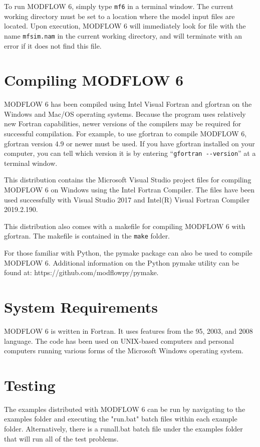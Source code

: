 \documentclass[11pt,twoside,twocolumn]{usgsreport}
\begin{document}
To run MODFLOW 6, simply type \texttt{mf6} in a terminal window.  The current working directory must be set to a location where the model input files are located.  Upon execution, MODFLOW 6 will immediately look for file with the name \texttt{mfsim.nam} in the current working directory, and will terminate with an error if it does not find this file.

\section{Compiling MODFLOW 6}
MODFLOW 6 has been compiled using Intel Visual Fortran and gfortran on the Windows and Mac/OS operating systems.  Because the program uses relatively new Fortran capabilities, newer versions of the compilers may be required for successful compilation.  For example, to use gfortran to compile MODFLOW 6, gfortran version 4.9 or newer must be used.  If you have gfortran installed on your computer, you can tell which version it is by entering ``\verb|gfortran --version|'' at a terminal window.

This distribution contains the Microsoft Visual Studio project files for compiling MODFLOW 6 on Windows using the Intel Fortran Compiler.  The files have been used successfully with Visual Studio 2017 and Intel(R) Visual Fortran Compiler 2019.2.190.

This distribution also comes with a makefile for compiling MODFLOW 6 with gfortran.  The makefile is contained in the \texttt{make} folder.

For those familiar with Python, the pymake package can also be used to compile MODFLOW 6.  Additional information on the Python pymake utility can be found at: https://github.com/modflowpy/pymake.  

\section{System Requirements}
MODFLOW 6 is written in Fortran.  It uses features from the 95, 2003, and 2008 language.  The code has been used on UNIX-based computers and personal computers running various forms of the Microsoft Windows operating system.

\section{Testing}
The examples distributed with MODFLOW 6 can be run by navigating to the examples folder and executing the "run.bat" batch files within each example folder.  Alternatively, there is a runall.bat batch file under the examples folder that will run all of the test problems.
\end{document}

